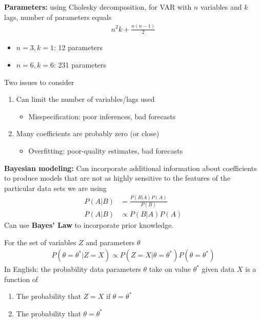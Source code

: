 \documentclass{beamer}
\begin{document}
\begin{frame}
 \textbf{Parameters:} using Cholesky decomposition, for VAR with $n$ variables and $k$ lags, number of parameters equals
 \begin{align}
   n^2k + \frac{n(n-1)}{2} 
 \end{align}
 \begin{itemize}
   \item $n=3,k=1$: 12 parameters
   \item $n=6,k=6$: 231 parameters
 \end{itemize}
 \medskip
 Two issues to consider
 \begin{enumerate}
   \item Can limit the number of variables/lags used
   \begin{itemize}
      \item Misspecification: poor inferences, bad forecasts
    \end{itemize} 
    \medskip
   \item Many coefficients are probably zero (or close)
   \begin{itemize}
     \item Overfitting: poor-quality estimates, bad forecasts
   \end{itemize}   
 \end{enumerate}
\end{frame}

\begin{frame}
  \textbf{Bayesian modeling:} Can incorporate additional information about coefficients to produce models that are not as highly sensitive to the features of the particular data sets we are using   
  \begin{align}
    P(A|B) &= \frac{P(B|A)P(A)}{P(B)}\\
    P(A|B)&\propto P(B|A)P(A)
  \end{align}
  \medskip
  Can use \textbf{Bayes' Law} to incorporate prior knowledge.
\end{frame}

\begin{frame}
 For the set of variables $Z$ and parameters $\theta$
\begin{align}
  P(\theta= \theta^* | Z=X) \propto P(Z=X | \theta =\theta^*)P(\theta= \theta^*)  
\end{align}
\medskip
In English: the probability data parameters $\theta$ take on value $\theta^*$ given data $X$ is a function of
\begin{enumerate}
  \item The probability that $Z=X$ if $\theta= \theta^*$
  \item The probability that $\theta = \theta^*$
\end{enumerate}
\end{frame}
\end{document}
